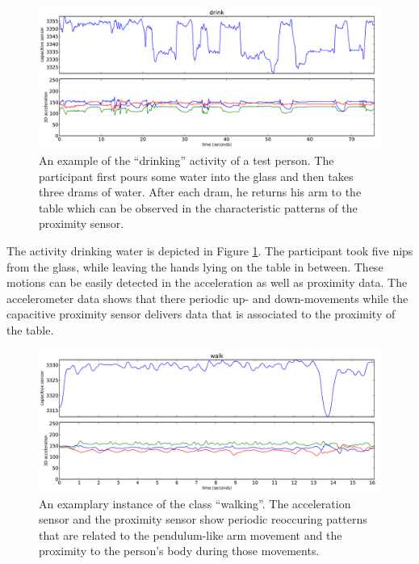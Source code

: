\documentclass[runningheads,a4paper]{llncs}
\begin{document}
\begin{figure}
	\centering
		\includegraphics[width=\textwidth]{../Auswertung/images/eugen_7.pdf}
	\caption{An example of the ``drinking'' activity of a test person. The participant first pours some water into the glass and then takes three drams of water. After each dram, he returns his arm to the table which can be observed in the characteristic patterns of the proximity sensor.}
	\label{fig:eugen_7}
\end{figure}

The activity drinking water is depicted in Figure \ref{fig:eugen_7}. The participant took five nips from the glass, while leaving the hands lying on the table in between. These motions can be easily detected in the acceleration as well as proximity data. The accelerometer data shows that there periodic up- and down-movements while the capacitive proximity sensor delivers data that is associated to the proximity of the table.

\begin{figure}
	\centering
		\includegraphics[width=1.00\textwidth]{../Auswertung/images/marko_8.pdf}
	\caption{An examplary instance of the class ``walking''. The acceleration sensor and the proximity sensor show periodic reoccuring patterns that are related to the pendulum-like arm movement and the proximity to the person's body during those movements.}
	\label{fig:marko_8}
\end{figure}
\end{document}
